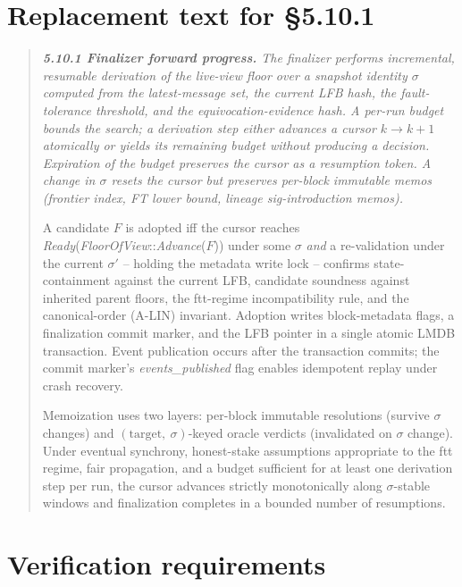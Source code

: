 \documentclass[11pt]{article}
\newcommand{\sigid}{\ensuremath{\sigma}}
\begin{document}
\section{Replacement text for §5.10.1}

\begin{quote}\itshape
\textbf{5.10.1 Finalizer forward progress.} The finalizer performs
incremental, resumable derivation of the live-view floor over a
snapshot identity $\sigid$ computed from the latest-message set, the
current LFB hash, the fault-tolerance threshold, and the
equivocation-evidence hash. A per-run budget bounds the search; a
derivation step either advances a cursor $k \to k{+}1$ atomically or
yields its remaining budget without producing a decision. Expiration
of the budget preserves the cursor as a resumption token. A change in
$\sigid$ resets the cursor but preserves per-block immutable memos
(frontier index, FT lower bound, lineage sig-introduction memos).

A candidate $F$ is adopted iff the cursor reaches
\emph{Ready}(\emph{FloorOfView}::\emph{Advance}($F$)) under some
$\sigid$ \emph{and} a re-validation under the current $\sigid'$ --
holding the metadata write lock -- confirms state-containment against
the current LFB, candidate soundness against inherited parent floors,
the ftt-regime incompatibility rule, and the canonical-order (A-LIN)
invariant. Adoption writes block-metadata flags, a finalization
commit marker, and the LFB pointer in a single atomic LMDB
transaction. Event publication occurs after the transaction commits;
the commit marker's \emph{events\_published} flag enables idempotent
replay under crash recovery.

Memoization uses two layers: per-block immutable resolutions (survive
$\sigid$ changes) and $(\text{target},\ \sigid)$-keyed oracle verdicts
(invalidated on $\sigid$ change). Under eventual synchrony,
honest-stake assumptions appropriate to the ftt regime, fair
propagation, and a budget sufficient for at least one derivation step
per run, the cursor advances strictly monotonically along
$\sigid$-stable windows and finalization completes in a bounded number
of resumptions.
\end{quote}

\section{Verification requirements}
\end{document}
